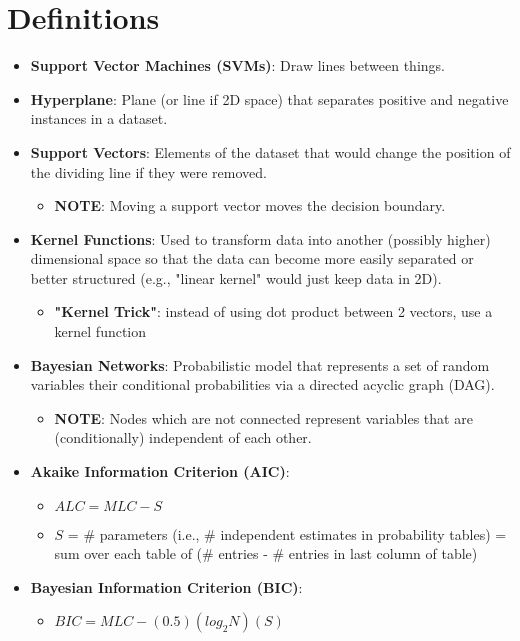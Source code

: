 \documentclass{article}
\begin{document}
\section{Definitions}

\begin{itemize}
	\item {\bf Support Vector Machines (SVMs)}: Draw lines between things.
	\item {\bf Hyperplane}: Plane (or line if 2D space) that separates positive and negative instances in a dataset.
	\item {\bf Support Vectors}: Elements of the dataset that would change the position of the dividing line if they were removed.
		\begin{itemize}
			\item {\bf NOTE}: Moving a support vector moves the decision boundary.
		\end{itemize} 
	\item {\bf Kernel Functions}: Used to transform data into another (possibly higher) dimensional space so that the data can become more easily separated or better structured (e.g., "linear kernel" would just keep data in 2D).
		\begin{itemize}
			\item {\bf "Kernel Trick"}: instead of using dot product between 2 vectors, use a kernel function
		\end{itemize}
	\item {\bf Bayesian Networks}: Probabilistic model that represents a set of random variables their conditional probabilities via a directed acyclic graph (DAG).
		\begin{itemize}
			\item {\bf NOTE}: Nodes which are not connected represent variables that are (conditionally) independent of each other.
		\end{itemize}
	\item {\bf Akaike Information Criterion (AIC)}:
		\begin{itemize}
			\item $ALC = MLC - S$
			\item $S$ = \# parameters (i.e., \# independent estimates in probability tables) = sum over each table of (\# entries - \# entries in last column of table)
		\end{itemize}
	\item {\bf Bayesian Information Criterion (BIC)}:
		\begin{itemize}
			\item $BIC = MLC - (0.5)(log_2 N)(S)$

\end{itemize}
\end{itemize}
\end{document}
